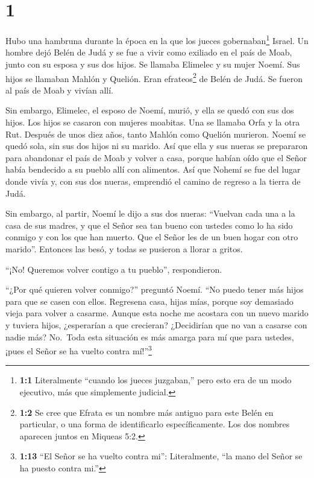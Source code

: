 \hypertarget{section}{%
\section{1}\label{section}}

 Hubo una hambruna durante la época en la que los jueces
gobernaban\footnote{\textbf{1:1} Literalmente ``cuando los jueces
  juzgaban,'' pero esto era de un modo ejecutivo, más que simplemente
  judicial.} Israel. Un hombre dejó Belén de Judá y se fue a vivir como
exiliado en el país de Moab, junto con su esposa y sus dos hijos.
 Se llamaba Elimelec y su mujer Noemí. Sus hijos se llamaban
Mahlón y Quelión. Eran efrateos\footnote{\textbf{1:2} Se cree que Efrata
  es un nombre más antiguo para este Belén en particular, o una forma de
  identificarlo específicamente. Los dos nombres aparecen juntos en
  Miqueas 5:2.} de Belén de Judá. Se fueron al país de Moab y vivían
allí.

 Sin embargo, Elimelec, el esposo de Noemí, murió, y ella se
quedó con sus dos hijos.  Los hijos se casaron con mujeres
moabitas. Una se llamaba Orfa y la otra Rut. Después de unos diez años,
 tanto Mahlón como Quelión murieron. Noemí se quedó sola,
sin sus dos hijos ni su marido.  Así que ella y sus nueras
se prepararon para abandonar el país de Moab y volver a casa, porque
habían oído que el Señor había bendecido a su pueblo allí con alimentos.
 Así que Nohemí se fue del lugar donde vivía y, con sus dos
nueras, emprendió el camino de regreso a la tierra de Judá.

 Sin embargo, al partir, Noemí le dijo a sus dos nueras:
``Vuelvan cada una a la casa de sus madres, y que el Señor sea tan bueno
con ustedes como lo ha sido conmigo y con los que han muerto.
 Que el Señor les de un buen hogar con otro marido''.
Entonces las besó, y todas se pusieron a llorar a gritos.

 ``¡No! Queremos volver contigo a tu pueblo'',
respondieron.

 ``¿Por qué quieren volver conmigo?'' preguntó Noemí. ``No
puedo tener más hijos para que se casen con ellos. 
Regresena casa, hijas mías, porque soy demasiado vieja para volver a
casarme. Aunque esta noche me acostara con un nuevo marido y tuviera
hijos,  ¿esperarían a que crecieran? ¿Decidirían que no van
a casarse con nadie más? No.~Toda esta situación es más amarga para mí
que para ustedes, ¡pues el Señor se ha vuelto contra mí!''\footnote{\textbf{1:13}
  ``El Señor se ha vuelto contra mi'': Literalmente, ``la mano del Señor
  se ha puesto contra mi.''}

